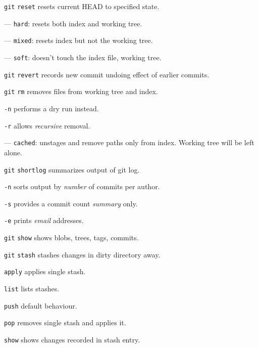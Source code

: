 \documentclass{reference_card}
\begin{document}
\begin{multicols*}{3}
\begin{compactenum}
\item [\texttt{git}] \texttt{reset} resets current HEAD to specified state.
\item [---] \texttt{hard}: resets both index and working tree.
\item [---] \texttt{mixed}: resets index but not the working tree.
\item [---] \texttt{soft}: doesn't touch the index file, working tree.
\end{compactenum}

\begin{compactenum}
\item [\texttt{git}] \texttt{revert} records new commit undoing effect of earlier commits.
\end{compactenum}

\begin{compactenum}
\item [\texttt{git}] \texttt{rm} removes files from working tree and index.
\item [\texttt{-n}] performs a dry run instead.
\item [\texttt{-r}] allows \emph{recursive} removal.
\item [---] \texttt{cached}: unstages and remove paths only from index. Working tree will be left alone.
\end{compactenum}

\begin{compactenum}
\item [\texttt{git}] \texttt{shortlog} summarizes output of git log.
\item [\texttt{-n}] sorts output by \emph{number} of commits per author.
\item [\texttt{-s}] provides a commit count \emph{summary} only.
\item [\texttt{-e}] prints \emph{email} addresses.
\end{compactenum}

\begin{compactenum}
\item [\texttt{git}] \texttt{show} shows blobs, trees, tags, commits.
\end{compactenum}

\begin{compactenum}
\item [\texttt{git}] \texttt{stash} stashes changes in dirty directory away.
\item [\scriptsize \texttt{apply}] applies single stash.
\item [\scriptsize \texttt{list}] lists stashes.
\item [\scriptsize \texttt{push}] default behaviour.
\item [\scriptsize \texttt{pop}] removes single stash and applies it.
\item [\scriptsize \texttt{show}] shows changes recorded in stash entry.
\end{compactenum}


\end{multicols*}
\end{document}
